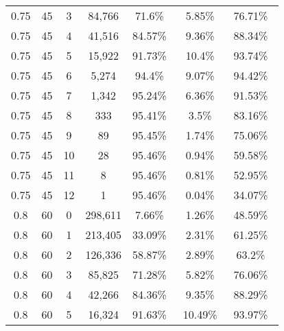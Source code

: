 \begin{figure}[!htbp]
{\begin{tabular}{ |c|c|c|c|c|c|c| }
        0.75             &45             &3            &84,766                 & 71.6\%\     & 5.85\%\               & 76.71\%\ \\
        0.75             &45             &4            &41,516                 & 84.57\%\     & 9.36\%\               & 88.34\%\ \\
        0.75             &45             &5            &15,922                 & 91.73\%\     & 10.4\%\               & 93.74\%\ \\
        0.75             &45             &6            &5,274                 & 94.4\%\     & 9.07\%\               & 94.42\%\ \\
        0.75             &45             &7            &1,342                 & 95.24\%\     & 6.36\%\               & 91.53\%\ \\
        0.75             &45             &8            &333                 & 95.41\%\     & 3.5\%\               & 83.16\%\ \\
        0.75             &45             &9            &89                 & 95.45\%\     & 1.74\%\               & 75.06\%\ \\
        0.75             &45             &10            &28                 & 95.46\%\     & 0.94\%\               & 59.58\%\ \\
        0.75             &45             &11            &8                 & 95.46\%\     & 0.81\%\               & 52.95\%\ \\
        0.75             &45             &12            &1                 & 95.46\%\     & 0.04\%\               & 34.07\%\ \\
        \hline
        0.8             &60             &0            &298,611                 & 7.66\%\     & 1.26\%\               & 48.59\%\ \\
        0.8             &60             &1            &213,405                 & 33.09\%\     & 2.31\%\               & 61.25\%\ \\
        0.8             &60             &2            &126,336                 & 58.87\%\     & 2.89\%\               & 63.2\%\ \\
        0.8             &60             &3            &85,825                 & 71.28\%\     & 5.82\%\               & 76.06\%\ \\
        0.8             &60             &4            &42,266                 & 84.36\%\     & 9.35\%\               & 88.29\%\ \\
        0.8             &60             &5            &16,324                 & 91.63\%\     & 10.49\%\               & 93.97\%\ \\

\end{tabular}}
\end{figure}

